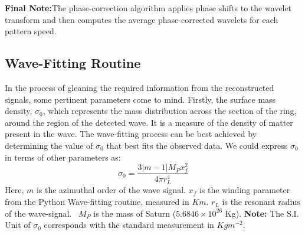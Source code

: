 \documentclass[conference]{IEEEtran}
\begin{document}
\textbf{Final Note:}The phase-correction algorithm applies phase shifts to the wavelet transform and then computes the average phase-corrected wavelets for each pattern speed. 

\subsection{Wave-Fitting Routine}
In the process of gleaning the required information from the reconstructed signals, some pertinent parameters come to mind.
Firstly, the surface mass density, $\sigma_{0}$, which represents the mass distribution across the section of the ring, around the region of the detected wave. It is a measure of the density of matter present in the wave. The wave-fitting process can be best achieved by determining the value of $\sigma_{0}$ that best fits the observed data. We could express $\sigma_{0}$ in terms of other parameters as:
\begin{equation}
\sigma_{0} = \frac{3 |m-1| M_{P}x_{f}^{2}}{4\pi r_{L}^{4}}
\end{equation}
Here, $m$ is the azimuthal order of the wave signal. $x_{f}$ is the winding parameter from the Python Wave-fitting routine, measured in $Km$. $r_{L}$ is the resonant radius of the wave-signal.  $M_{P}$ is the mass of Saturn ($5.6846 \times 10^{26}$ Kg). \textbf{Note:} The S.I. Unit of $\sigma_{0}$ corresponds with the standard measurement in $Kgm^{-2}$.
\end{document}
